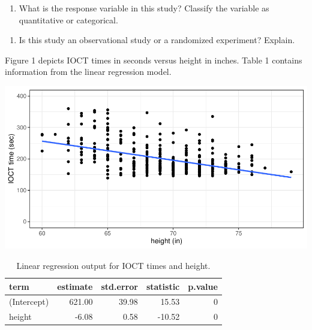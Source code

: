 \documentclass[
]{book}
\providecommand{\tightlist}{%
  \setlength{\itemsep}{0pt}\setlength{\parskip}{0pt}}
\begin{document}
\begin{enumerate}
\def\labelenumi{\arabic{enumi}.}
\setcounter{enumi}{2}
\tightlist
\item
  What is the response variable in this study? Classify the variable as quantitative or categorical.
\end{enumerate}

\vspace{0.25in}

\begin{enumerate}
\def\labelenumi{\arabic{enumi}.}
\setcounter{enumi}{3}
\tightlist
\item
  Is this study an observational study or a randomized experiment? Explain.
\end{enumerate}

\vspace{1in}

\newpage

Figure 1 depicts IOCT times in seconds versus height in inches. Table 1 contains information from the linear regression model.

\includegraphics{MA206supplement_files/figure-latex/unnamed-chunk-16-1.pdf}

\begin{table}

\caption{\label{tab:unnamed-chunk-16}Linear regression output for IOCT times and height.}
\centering
\begin{tabular}[t]{l|r|r|r|r}
\hline
term & estimate & std.error & statistic & p.value\\
\hline
(Intercept) & 621.00 & 39.98 & 15.53 & 0\\
\hline
height & -6.08 & 0.58 & -10.52 & 0\\
\hline
\end{tabular}
\end{table}
\end{document}

